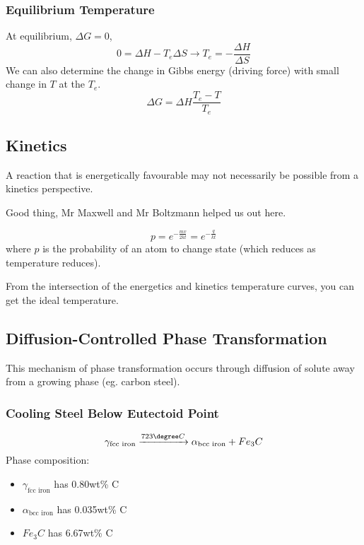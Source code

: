 \subsubsection{Equilibrium Temperature}
At equilibrium, $\Delta G = 0$,
\begin{equation}
  0 = \Delta H - T_e\Delta S \rightarrow T_e = -\frac{\Delta H}{\Delta S}
\end{equation}
We can also determine the change in Gibbs energy (driving force) with small change in $T$ at the $T_e$.
\begin{equation}
\Delta G = \Delta H \frac{T_e - T}{T_e}  
\end{equation}

\subsection{Kinetics} %
\label{sub:kinetics}
A reaction that is energetically favourable may not necessarily be possible from a kinetics perspective. 

Good thing, Mr Maxwell and Mr Boltzmann helped us out here.

\begin{equation}
  p =  e^{-\frac{mv}{2kt}} = e^{-\frac{q}{kt}}
\end{equation}
where $p$ is the probability of an atom to change state (which reduces as temperature reduces).

From the intersection of the energetics and kinetics temperature curves, you can get the ideal temperature.

\subsection{Diffusion-Controlled Phase Transformation} %
\label{sub:diffusion_controlled_phase_transformation}

This mechanism of phase transformation occurs through diffusion of solute away from a growing phase (eg. carbon steel).

\subsubsection{Cooling Steel Below Eutectoid Point}
\begin{equation}
  \gamma_\text{fcc iron} \xrightarrow{723\degree C} \alpha_\text{bcc iron} + Fe_3C
\end{equation}
Phase composition:
\begin{itemize}
  \item $\gamma_\text{fcc iron}$ has 0.80wt\% C
  \item $\alpha_\text{bcc iron}$ has 0.035wt\% C
  \item $Fe_3C$ has 6.67wt\% C
\end{itemize}

